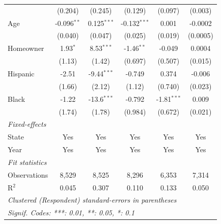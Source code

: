 \begin{tabular}{lccccc}
                                  & (0.204)             & (0.245)              & (0.129)                                      & (0.097)                               & (0.003)\\   
   Age                            & -0.096$^{**}$       & 0.125$^{***}$        & -0.132$^{***}$                               & 0.001                                 & -0.0002\\   
                                  & (0.040)             & (0.047)              & (0.025)                                      & (0.019)                               & (0.0005)\\   
   Homeowner                      & 1.93$^{*}$          & 8.53$^{***}$         & -1.46$^{**}$                                 & -0.049                                & 0.0004\\   
                                  & (1.13)              & (1.42)               & (0.697)                                      & (0.507)                               & (0.015)\\   
   Hispanic                       & -2.51               & -9.44$^{***}$        & -0.749                                       & 0.374                                 & -0.006\\   
                                  & (1.66)              & (2.12)               & (1.12)                                       & (0.740)                               & (0.023)\\   
   Black                          & -1.22               & -13.6$^{***}$        & -0.792                                       & -1.81$^{***}$                         & 0.009\\   
                                  & (1.74)              & (1.78)               & (0.984)                                      & (0.672)                               & (0.021)\\   
   \midrule
   \emph{Fixed-effects}\\
   State                          & Yes                 & Yes                  & Yes                                          & Yes                                   & Yes\\  
   Year                           & Yes                 & Yes                  & Yes                                          & Yes                                   & Yes\\  
   \midrule
   \emph{Fit statistics}\\
   Observations                   & 8,529               & 8,525                & 8,296                                        & 6,353                                 & 7,314\\  
   R$^2$                          & 0.045               & 0.307                & 0.110                                        & 0.133                                 & 0.050\\  
   \midrule \midrule
   \multicolumn{6}{l}{\emph{Clustered (Respondent) standard-errors in parentheses}}\\
   \multicolumn{6}{l}{\emph{Signif. Codes: ***: 0.01, **: 0.05, *: 0.1}}\\
\end{tabular}
\par\endgroup


